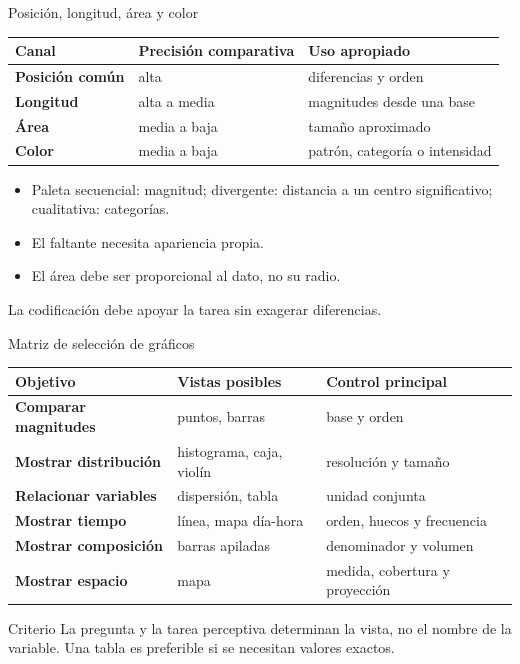 \documentclass[aspectratio=169,11pt]{beamer}
\begin{document}
\begin{frame}{Posición, longitud, área y color}
  \small
  \begin{tabularx}{\textwidth}{>{\bfseries}p{} p{} X}
    \toprule
    Canal & Precisión comparativa & Uso apropiado \\
    \midrule
    Posición común & alta & diferencias y orden \\
    Longitud & alta a media & magnitudes desde una base \\
    Área & media a baja & tamaño aproximado \\
    Color & media a baja & patrón, categoría o intensidad \\
    \bottomrule
  \end{tabularx}
  \vspace{.6em}
  \begin{itemize}
    \item Paleta secuencial: magnitud; divergente: distancia a un centro significativo; cualitativa: categorías.
    \item El faltante necesita apariencia propia.
    \item El área debe ser proporcional al dato, no su radio.
  \end{itemize}
  \centering\alert{La codificación debe apoyar la tarea sin exagerar diferencias.}
\end{frame}

\begin{frame}{Matriz de selección de gráficos}
  \footnotesize
  \begin{tabularx}{\textwidth}{>{\bfseries}p{} p{} X}
    \toprule
    Objetivo & Vistas posibles & Control principal \\
    \midrule
    Comparar magnitudes & puntos, barras & base y orden \\
    Mostrar distribución & histograma, caja, violín & resolución y tamaño \\
    Relacionar variables & dispersión, tabla & unidad conjunta \\
    Mostrar tiempo & línea, mapa día-hora & orden, huecos y frecuencia \\
    Mostrar composición & barras apiladas & denominador y volumen \\
    Mostrar espacio & mapa & medida, cobertura y proyección \\
    \bottomrule
  \end{tabularx}
  \vspace{.7em}
  \begin{block}{Criterio}
    La pregunta y la tarea perceptiva determinan la vista, no el nombre de la variable. Una tabla es preferible si se necesitan valores exactos.
  \end{block}
\end{frame}
\end{document}
